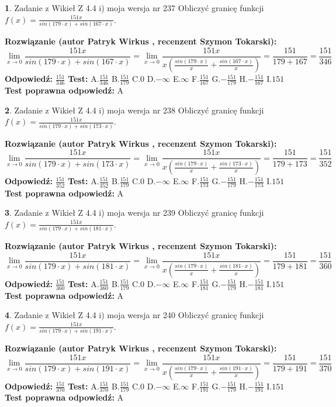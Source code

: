 \documentclass[12pt, a4paper]{article}
\theoremstyle{definition} %
\newtheorem{zad}{}
\newcommand{\zadStart}[1]{\begin{zad}#1\newline}
\newcommand{\zadStop}{\end{zad}}
\newcommand{\rozwStart}[2]{\noindent \textbf{Rozwiązanie (autor #1 , recenzent #2): }\newline}
\newcommand{\rozwStop}{\newline}
\newcommand{\odpStart}{\noindent \textbf{Odpowiedź:}\newline}
\newcommand{\odpStop}{\newline}
\newcommand{\testStart}{\noindent \textbf{Test:}\newline}
\newcommand{\testStop}{\newline}
\newcommand{\kluczStart}{\noindent \textbf{Test poprawna odpowiedź:}\newline}
\newcommand{\kluczStop}{\newline}
\begin{document}
\zadStart{Zadanie z Wikieł Z 4.4 i) moja wersja nr 237}
Obliczyć granicę funkcji $f(x)=\frac{151x}{sin(179\cdot x) +sin(167\cdot x)}$.
\zadStop
\rozwStart{Patryk Wirkus}{Szymon Tokarski}
$$\lim\limits_{x\to 0}\frac{151x}{sin(179\cdot x) +sin(167\cdot x)}=\lim\limits_{x\to 0}\frac{151x}{x(\frac{sin(179\cdot x)}{x}+\frac{sin(167\cdot x)}{x})}=\frac{151}{179+167} = \frac{151}{346}$$
\rozwStop
\odpStart
$\frac{151}{346}$
\odpStop
\testStart
A.$\frac{151}{346}$
B.$\frac{151}{179}$
C.$0$
D.$-\infty$
E.$\infty$
F.$\frac{151}{167}$
G.$-\frac{151}{179}$
H.$-\frac{151}{167}$
I.$151$
\testStop
\kluczStart
A
\kluczStop



\zadStart{Zadanie z Wikieł Z 4.4 i) moja wersja nr 238}
Obliczyć granicę funkcji $f(x)=\frac{151x}{sin(179\cdot x) +sin(173\cdot x)}$.
\zadStop
\rozwStart{Patryk Wirkus}{Szymon Tokarski}
$$\lim\limits_{x\to 0}\frac{151x}{sin(179\cdot x) +sin(173\cdot x)}=\lim\limits_{x\to 0}\frac{151x}{x(\frac{sin(179\cdot x)}{x}+\frac{sin(173\cdot x)}{x})}=\frac{151}{179+173} = \frac{151}{352}$$
\rozwStop
\odpStart
$\frac{151}{352}$
\odpStop
\testStart
A.$\frac{151}{352}$
B.$\frac{151}{179}$
C.$0$
D.$-\infty$
E.$\infty$
F.$\frac{151}{173}$
G.$-\frac{151}{179}$
H.$-\frac{151}{173}$
I.$151$
\testStop
\kluczStart
A
\kluczStop



\zadStart{Zadanie z Wikieł Z 4.4 i) moja wersja nr 239}
Obliczyć granicę funkcji $f(x)=\frac{151x}{sin(179\cdot x) +sin(181\cdot x)}$.
\zadStop
\rozwStart{Patryk Wirkus}{Szymon Tokarski}
$$\lim\limits_{x\to 0}\frac{151x}{sin(179\cdot x) +sin(181\cdot x)}=\lim\limits_{x\to 0}\frac{151x}{x(\frac{sin(179\cdot x)}{x}+\frac{sin(181\cdot x)}{x})}=\frac{151}{179+181} = \frac{151}{360}$$
\rozwStop
\odpStart
$\frac{151}{360}$
\odpStop
\testStart
A.$\frac{151}{360}$
B.$\frac{151}{179}$
C.$0$
D.$-\infty$
E.$\infty$
F.$\frac{151}{181}$
G.$-\frac{151}{179}$
H.$-\frac{151}{181}$
I.$151$
\testStop
\kluczStart
A
\kluczStop



\zadStart{Zadanie z Wikieł Z 4.4 i) moja wersja nr 240}
Obliczyć granicę funkcji $f(x)=\frac{151x}{sin(179\cdot x) +sin(191\cdot x)}$.
\zadStop
\rozwStart{Patryk Wirkus}{Szymon Tokarski}
$$\lim\limits_{x\to 0}\frac{151x}{sin(179\cdot x) +sin(191\cdot x)}=\lim\limits_{x\to 0}\frac{151x}{x(\frac{sin(179\cdot x)}{x}+\frac{sin(191\cdot x)}{x})}=\frac{151}{179+191} = \frac{151}{370}$$
\rozwStop
\odpStart
$\frac{151}{370}$
\odpStop
\testStart
A.$\frac{151}{370}$
B.$\frac{151}{179}$
C.$0$
D.$-\infty$
E.$\infty$
F.$\frac{151}{191}$
G.$-\frac{151}{179}$
H.$-\frac{151}{191}$
I.$151$
\testStop
\kluczStart
A
\kluczStop
\end{document}

